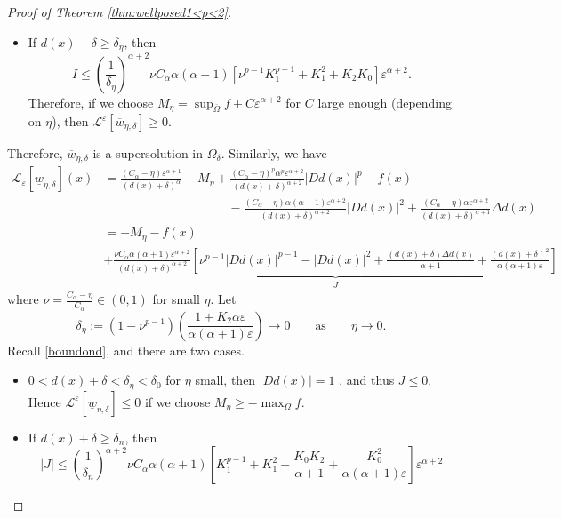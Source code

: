 \documentclass[11pt,reqno]{amsart}
\numberwithin{figure}{section}
\theoremstyle{plain}
\theoremstyle{remark}
\numberwithin{equation}{section}
\begin{document}
\begin{appendices}
\begin{proof} [Proof of Theorem \ref{thm:wellposed1<p<2}]
\begin{itemize}
    \item If $d(x)-\delta\geq \delta_\eta$, then 
    \begin{equation*}
        I \leq \left(\frac{1}{\delta_\eta}\right)^{\alpha+2}\nu C_\alpha \alpha(\alpha+1)\left[\nu^{p-1}K_1^{p-1}+K_1^2+K_2K_0\right]\varepsilon^{\alpha+2}.
    \end{equation*}
    Therefore, if we choose $M_\eta = \sup_{\overline{\Omega}} f + C\varepsilon^{\alpha+2}$ for $C$ large enough (depending on $\eta$), then $\mathcal{L}^\varepsilon\left[\overline{w}_{\eta,\delta}\right]\geq 0$.
\end{itemize}
Therefore, $\overline{w}_{\eta,\delta}$ is a supersolution in $\Omega_\delta$. Similarly, we have 
\begin{align*}
    \mathcal{L}_\varepsilon\left[\underline{w}_{\eta,\delta}\right](x) &= \frac{ (C_\alpha - \eta)\varepsilon^{\alpha+1}}{(d(x)+\delta)^\alpha} - M_\eta + \frac{(C_\alpha-\eta)^p \alpha^p\varepsilon^{\alpha+2}}{(d(x)+\delta)^{\alpha+2}}|D d(x)|^p - f(x) \\
    & \qquad\qquad\qquad\qquad\qquad - \frac{(C_\alpha-\eta)\alpha(\alpha+1)\varepsilon^{\alpha+2}}{(d(x)+\delta)^{\alpha+2}}|D d(x)|^2 + \frac{(C_\alpha-\eta)\alpha \varepsilon^{\alpha+2}}{(d(x)+\delta)^{\alpha+1}}\Delta d(x)\\
    &= - M_\eta - f(x) \\
    &+\underbrace{\frac{\nu C_\alpha\alpha(\alpha+1)\varepsilon^{\alpha+2}}{(d(x)+\delta)^{\alpha+2}}\left[\nu^{p-1}|Dd(x)|^{p-1} - |Dd(x)|^2 + \frac{(d(x)+\delta)\Delta d(x)}{\alpha+1}+\frac{(d(x)+\delta)^2}{\alpha(\alpha+1)\varepsilon}\right]}_{J}
\end{align*}
where $\nu = \frac{C_\alpha-\eta}{C_\alpha}\in (0,1)$ for small $\eta$. Let
\begin{equation*}
    \delta_\eta := \left(1-\nu^{p-1}\right)\left(\frac{1+K_2\alpha\varepsilon}{\alpha(\alpha+1)\varepsilon}\right) \to 0 \qquad\text{as} \qquad \eta\to 0.
\end{equation*}
Recall \eqref{boundond}, and there are two cases.
\begin{itemize}
    \item $0<d(x)+\delta<\delta_\eta < \delta_0$ for $\eta$ small, then $|Dd(x)| = 1$ , and thus $J\leq 0$. Hence $\mathcal{L}^\varepsilon\left[\underline{w}_{\eta,\delta}\right]\leq 0$ if we choose $M_\eta \geq -\max_{\Omega}f$.
    \item If $d(x)+\delta\geq \delta_n$, then
    \begin{equation*}
        |J|\leq \left(\frac{1}{\delta_n}\right)^{\alpha+2} \nu C_\alpha\alpha(\alpha+1)\left[K_1^{p-1}+K_1^2 + \frac{K_0K_2}{\alpha+1} + \frac{K_0^2}{\alpha(\alpha+1)\varepsilon}\right]\varepsilon^{\alpha+2}

\end{equation*}
\end{itemize}
\end{proof}
\end{appendices}
\end{document}
